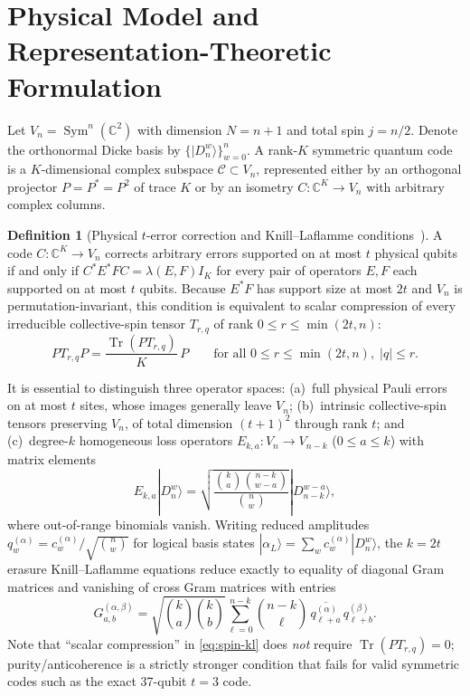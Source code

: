 \documentclass[11pt,letterpaper]{article}
\theoremstyle{definition}
\newtheorem{definition}[theorem]{Definition}
\theoremstyle{remark}
\newcommand{\Tr}{\operatorname{Tr}}
\newcommand{\Sym}{\operatorname{Sym}}
\newcommand{\C}{\mathbb{C}}
\newcommand{\ket}[1]{|#1\rangle}
\begin{document}
\section{Physical Model and Representation-Theoretic Formulation}
Let $V_n = \Sym^n(\C^2)$ with dimension $N = n+1$ and total spin $j = n/2$. Denote the orthonormal Dicke basis by $\{\ket{D_n^w}\}_{w=0}^n$. A rank-$K$ symmetric quantum code is a $K$-dimensional complex subspace $\mathcal{C} \subset V_n$, represented either by an orthogonal projector $P = P^* = P^2$ of trace $K$ or by an isometry $C:\C^K \to V_n$ with arbitrary complex columns.

\begin{definition}[Physical $t$-error correction and Knill--Laflamme conditions~\cite{KnillLaflamme1997}]\label{def:kl}
A code $C:\C^K \to V_n$ corrects arbitrary errors supported on at most $t$ physical qubits if and only if $C^* E^* F C = \lambda(E,F) I_K$ for every pair of operators $E,F$ each supported on at most $t$ qubits. Because $E^*F$ has support size at most $2t$ and $V_n$ is permutation-invariant, this condition is equivalent to scalar compression of every irreducible collective-spin tensor $T_{r,q}$ of rank $0 \le r \le \min(2t,n)$:
\begin{equation}\label{eq:spin-kl}
  P T_{r,q} P = \frac{\Tr(P T_{r,q})}{K}\, P \qquad \text{for all } 0 \le r \le \min(2t,n),\; |q| \le r.
\end{equation}
\end{definition}

It is essential to distinguish three operator spaces: (a)~full physical Pauli errors on at most $t$ sites, whose images generally leave $V_n$; (b)~intrinsic collective-spin tensors preserving $V_n$, of total dimension $(t+1)^2$ through rank $t$; and (c)~degree-$k$ homogeneous loss operators $E_{k,a}: V_n \to V_{n-k}$ ($0 \le a \le k$) with matrix elements
\begin{equation}\label{eq:kraus-loss}
  E_{k,a}\ket{D_n^w} = \sqrt{\frac{\binom{k}{a}\binom{n-k}{w-a}}{\binom{n}{w}}}\ket{D_{n-k}^{w-a}},
\end{equation}
where out-of-range binomials vanish. Writing reduced amplitudes $q_w^{(\alpha)} = c_w^{(\alpha)} / \sqrt{\binom{n}{w}}$ for logical basis states $\ket{\alpha_L} = \sum_w c_w^{(\alpha)} \ket{D_n^w}$, the $k=2t$ erasure Knill--Laflamme equations reduce exactly to equality of diagonal Gram matrices and vanishing of cross Gram matrices with entries
\begin{equation}\label{eq:gram-kl}
  G^{(\alpha,\beta)}_{a,b} = \sqrt{\binom{k}{a}\binom{k}{b}} \sum_{\ell=0}^{n-k} \binom{n-k}{\ell}\,\overline{q_{\ell+a}^{(\alpha)}}\, q_{\ell+b}^{(\beta)}.
\end{equation}
Note that ``scalar compression'' in \eqref{eq:spin-kl} does \emph{not} require $\Tr(P T_{r,q}) = 0$; purity/anticoherence is a strictly stronger condition that fails for valid symmetric codes such as the exact 37-qubit $t=3$ code.
\end{document}
